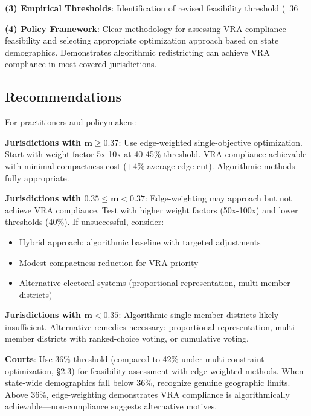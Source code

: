 \textbf{(3) Empirical Thresholds}: Identification of revised feasibility threshold (~36%

\textbf{(4) Policy Framework}: Clear methodology for assessing VRA compliance feasibility and selecting appropriate optimization approach based on state demographics. Demonstrates algorithmic redistricting can achieve VRA compliance in most covered jurisdictions.

\subsection{Recommendations}

For practitioners and policymakers:

\textbf{Jurisdictions with $\boldsymbol{m \geq 0.37}$}: Use edge-weighted single-objective optimization. Start with weight factor 5x-10x at 40-45\% threshold. VRA compliance achievable with minimal compactness cost (+4\% average edge cut). Algorithmic methods fully appropriate.

\textbf{Jurisdictions with $\boldsymbol{0.35 \leq m < 0.37}$}: Edge-weighting may approach but not achieve VRA compliance. Test with higher weight factors (50x-100x) and lower thresholds (40\%). If unsuccessful, consider:
\begin{itemize}
\item Hybrid approach: algorithmic baseline with targeted adjustments
\item Modest compactness reduction for VRA priority
\item Alternative electoral systems (proportional representation, multi-member districts)
\end{itemize}

\textbf{Jurisdictions with $\boldsymbol{m < 0.35}$}: Algorithmic single-member districts likely insufficient. Alternative remedies necessary: proportional representation, multi-member districts with ranked-choice voting, or cumulative voting.

\textbf{Courts}: Use 36\% threshold (compared to 42\% under multi-constraint optimization, §2.3) for feasibility assessment with edge-weighted methods. When state-wide demographics fall below 36\%, recognize genuine geographic limits. Above 36\%, edge-weighting demonstrates VRA compliance is algorithmically achievable—non-compliance suggests alternative motives.

